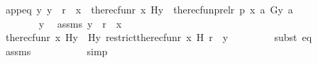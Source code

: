 \begin{isabellebody}
\ app{\isacharunderscore}{\kern0pt}eq{\isacharcolon}{\kern0pt}\ {\isachardoublequoteopen}{\isasymAnd}y{\isachardot}{\kern0pt}\ y\ {\isasymin}\ r\ {\isacharminus}{\kern0pt}{\isacharbackquote}{\kern0pt}{\isacharbackquote}{\kern0pt}\ {\isacharbraceleft}{\kern0pt}x{\isacharbraceright}{\kern0pt}\ {\isasymLongrightarrow}\ the{\isacharunderscore}{\kern0pt}recfun{\isacharparenleft}{\kern0pt}r{\isacharcomma}{\kern0pt}\ x{\isacharcomma}{\kern0pt}\ H{\isacharparenright}{\kern0pt}{\isacharbackquote}{\kern0pt}y\ {\isacharequal}{\kern0pt}\ the{\isacharunderscore}{\kern0pt}recfun{\isacharparenleft}{\kern0pt}prel{\isacharparenleft}{\kern0pt}r{\isacharcomma}{\kern0pt}\ p{\isacharparenright}{\kern0pt}{\isacharcomma}{\kern0pt}\ {\isacharless}{\kern0pt}x{\isacharcomma}{\kern0pt}\ a{\isachargreater}{\kern0pt}{\isacharcomma}{\kern0pt}\ G{\isacharparenright}{\kern0pt}{\isacharbackquote}{\kern0pt}{\isacharless}{\kern0pt}y{\isacharcomma}{\kern0pt}\ a{\isachargreater}{\kern0pt}{\isachardoublequoteclose}\ \isanewline
\ \ \ \ \isamarkupfalse%
\ {\isacharminus}{\kern0pt}\ \isanewline
\ \ \ \ \ \ \isamarkupfalse%
\ y\ \isamarkupfalse%
\ assms{}{\isacharcolon}{\kern0pt}\ {\isachardoublequoteopen}y\ {\isasymin}\ r\ {\isacharminus}{\kern0pt}{\isacharbackquote}{\kern0pt}{\isacharbackquote}{\kern0pt}\ {\isacharbraceleft}{\kern0pt}x{\isacharbraceright}{\kern0pt}{\isachardoublequoteclose}\ \isanewline
\ \ \ \ \ \ \isamarkupfalse%
\ {\isachardoublequoteopen}the{\isacharunderscore}{\kern0pt}recfun{\isacharparenleft}{\kern0pt}r{\isacharcomma}{\kern0pt}\ x{\isacharcomma}{\kern0pt}\ H{\isacharparenright}{\kern0pt}{\isacharbackquote}{\kern0pt}y\ {\isacharequal}{\kern0pt}\ H{\isacharparenleft}{\kern0pt}y{\isacharcomma}{\kern0pt}\ restrict{\isacharparenleft}{\kern0pt}the{\isacharunderscore}{\kern0pt}recfun{\isacharparenleft}{\kern0pt}r{\isacharcomma}{\kern0pt}\ x{\isacharcomma}{\kern0pt}\ H{\isacharparenright}{\kern0pt}{\isacharcomma}{\kern0pt}\ r\ {\isacharminus}{\kern0pt}{\isacharbackquote}{\kern0pt}{\isacharbackquote}{\kern0pt}\ {\isacharbraceleft}{\kern0pt}y{\isacharbraceright}{\kern0pt}{\isacharparenright}{\kern0pt}{\isacharparenright}{\kern0pt}{\isachardoublequoteclose}\isanewline
\ \ \ \ \ \ \ \ \isamarkupfalse%
{\isacharparenleft}{\kern0pt}subst\ eq{}{\isacharparenright}{\kern0pt}\isanewline
\ \ \ \ \ \ \ \ \isamarkupfalse%
\ assms{}\ \isanewline
\ \ \ \ \ \ \ \ \isamarkupfalse%
\ simp\isanewline
\ \ \ \ \ \ \isamarkupfalse%

\end{isabellebody}
